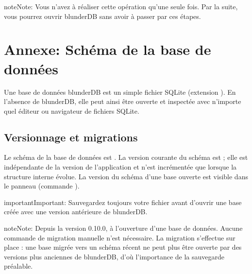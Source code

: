 \documentclass[letterpaper,10pt,french]{sphinxmanual}
\begin{document}
\begin{sphinxadmonition}{note}{Note:}
\sphinxAtStartPar
Vous n’avez à réaliser cette opération qu’une seule fois. Par la
suite, vous pourrez ouvrir blunderDB sans avoir à passer par ces étapes.
\end{sphinxadmonition}

\sphinxstepscope


\section{Annexe: Schéma de la base de données}
\label{\detokenize{annexe_db_scheme:annexe-schema-de-la-base-de-donnees}}\label{\detokenize{annexe_db_scheme:annexe-db-migration}}\label{\detokenize{annexe_db_scheme::doc}}
\sphinxAtStartPar
Une base de données blunderDB est un simple fichier SQLite (extension ).
En l’absence de blunderDB, elle peut ainsi être ouverte et inspectée avec
n’importe quel éditeur ou navigateur de fichiers SQLite.


\subsection{Versionnage et migrations}
\label{\detokenize{annexe_db_scheme:versionnage-et-migrations}}
\sphinxAtStartPar
Le schéma de la base de données est . La version courante du
schéma est  ; elle est indépendante de la version de l’application et
n’est incrémentée que lorsque la structure interne évolue. La version du schéma
d’une base ouverte est visible dans le panneau  (commande
).

\begin{sphinxadmonition}{important}{Important:}
\sphinxAtStartPar
Sauvegardez toujours votre fichier  avant d’ouvrir une base créée avec
une version antérieure de blunderDB.
\end{sphinxadmonition}

\begin{sphinxadmonition}{note}{Note:}
\sphinxAtStartPar
Depuis la version 0.10.0,  à l’ouverture d’une base de données. Aucune commande de
migration manuelle n’est nécessaire. La migration s’effectue sur place :
une base migrée vers un schéma récent ne peut plus être ouverte par des
versions plus anciennes de blunderDB, d’où l’importance de la sauvegarde
préalable.
\end{sphinxadmonition}
\end{document}

